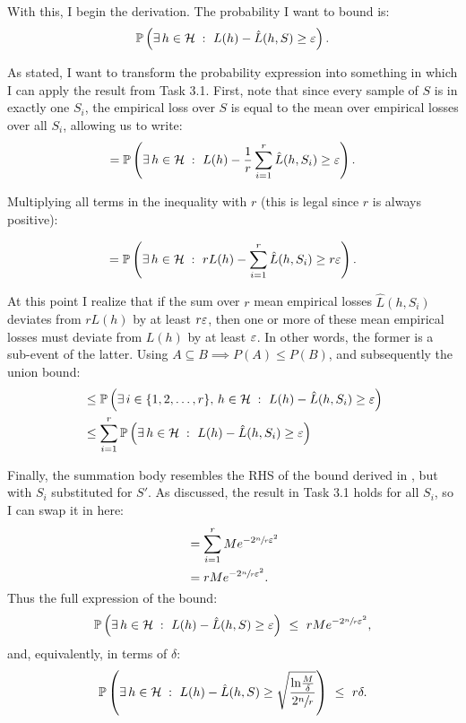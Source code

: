 \bigskip

With this, I begin the derivation. The probability I want to bound is:
\begin{align*}
  \mathbb P \left(\exists\, h \in \mathcal H\; :\ L(h) - \hat L(h, S) \geq \varepsilon\right).
\end{align*}

As stated, I want to transform the probability expression into something in
which I can apply the result from Task 3.1. First, note that since every sample
of $S$ is in exactly one $S_i$, the empirical loss over $S$ is equal to the mean
over empirical losses over all $S_i$, allowing us to write:
\begin{align*}
  = \mathbb P \left(\exists\, h \in \mathcal H\; :\ L(h) - \frac{1}{r}\sum_{i = 1}^r \hat
  L(h, S_i) \geq \varepsilon\right).
\end{align*}

Multiplying all terms in the inequality with $r$ (this is legal since $r$ is
always positive):

\begin{align*}
  = \mathbb P \left(\exists\, h \in \mathcal H\; :\ rL(h) - \sum_{i = 1}^r \hat
  L(h, S_i) \geq r \varepsilon\right).
\end{align*}

At this point I realize that if the sum over $r$ mean empirical losses $\hat
L(h, S_i)$ deviates from $rL(h)$ by at least $r\varepsilon$, then one or more of these
mean empirical losses must deviate from $L(h)$ by at least $\varepsilon$. In other
words, the former is a sub-event of the latter. Using $A \subseteq B \implies
P(A) \leq P(B)$, and subsequently the union bound:
\begin{align*}
  &\leq \mathbb P \left(\exists\, i \in \{1, 2, \dots, r\},\, h \in \mathcal H\; :\  L(h) - \hat L(h,
  S_i) \geq \varepsilon\right)\\
  &\leq \sum_{i = 1}^r \mathbb P \left(\exists\, h \in \mathcal H\; :\ L(h)
  - \hat L(h, S_i) \geq \varepsilon\right)
\end{align*}

Finally, the summation body resembles the RHS of the bound derived in
, but with $S_i$ substituted for $S'$. As discussed, the result in
Task 3.1 holds for all $S_i$, so I can swap it in here:
\begin{align*}
  &= \sum_{i = 1}^r M e^{-2\sfrac{n}{r}\varepsilon^2} \\
  &= r M e^{-2\sfrac{n}{r}\varepsilon^2}.
\end{align*}
Thus the full expression of the bound:
\begin{align*}
   \PP{\exists\, h \in \mathcal H\; :\  L(h) - \hat L(h, S) \geq \eps}\ \leq\ r M
   e^{-2\sfrac{n}{r}\eps^2},
\end{align*}
and, equivalently, in terms of $\delta$:
\begin{align*}
   \mathbb P \left(\exists\, h \in \mathcal H\; :\  L(h) - \hat L(h, S) \geq
   \sqrt{\frac{\text{ln}\frac{M}{\delta}}{2 \sfrac{n}{r}}}\right)\ \leq\  r \delta.
\end{align*}

